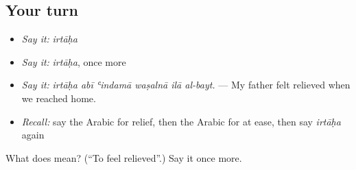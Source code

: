 \subsection*{Your turn}
\begin{itemize}
\raggedright
  \item \emph{Say it:} \emph{irtāḥa}
  \item \emph{Say it:} \emph{irtāḥa}, once more
  \item \emph{Say it:} \emph{irtāḥa abī ʿindamā waṣalnā ilā al-bayt.} — My father felt relieved when we reached home.
  \item \emph{Recall:} say the Arabic for relief, then the Arabic for at ease, then say \emph{irtāḥa} again
\end{itemize}

\begin{tcolorbox}[breakable,colback=teal!4,colframe=teal!35!black,title={Before you move on}]
What does  mean? (\textquotedblleft{}To feel relieved\textquotedblright{}.) Say it once more.
\end{tcolorbox}
